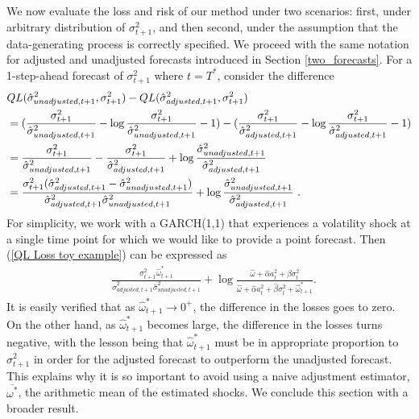 \documentclass{uiucthesis2021}
\theoremstyle{definition}
\begin{document}
We now evaluate the loss and risk of our method under two scenarios: first, under arbitrary distribution of $\sigma^{2}_{t+1}$, and then second, under the assumption that the data-generating process is correctly specified.  We proceed with the same notation for adjusted and unadjusted forecasts introduced in Section \ref{two_forecasts}.  For a 1-step-ahead forecast of $\sigma^{2}_{t+1}$ where $t=T^{*}$, consider the difference 
\begin{align}
  & QL(\hat\sigma_{unadjusted,t+1}^{2},\sigma^{2}_{t+1})-QL(\hat\sigma^{2}_{adjusted,t+1},\sigma^{2}_{t+1})\notag \\
   & =(\frac{\sigma_{t+1}^{2}}{\hat\sigma^{2}_{unadjusted,t+1}} - \log{\frac{\sigma_{t+1}^{2}}{\hat\sigma^{2}_{unadjusted,t+1}} } - 1) - (\frac{\sigma_{t+1}^{2}}{\hat\sigma^{2}_{adjusted,t+1}} - \log{\frac{\sigma_{t+1}^{2}}{\hat\sigma^{2}_{adjusted,t+1}}} - 1)\notag\\
   & = \frac{\sigma_{t+1}^{2}}{\hat\sigma^{2}_{unadjusted,t+1}} - \frac{\sigma_{t+1}^{2}}{\hat\sigma^{2}_{adjusted,t+1}}+ \log{\frac{\hat\sigma^{2}_{unadjusted,t+1}}{\hat\sigma^{2}_{adjusted,t+1}}}\notag\\
   & = \frac{\sigma_{t+1}^{2}(\hat\sigma^{2}_{adjusted,t+1}-\hat\sigma^{2}_{unadjusted,t+1})}{\hat\sigma^{2}_{adjusted,t+1}\hat\sigma^{2}_{unadjusted,t+1}} + \log{\frac{\hat\sigma^{2}_{unadjusted,t+1}}{\hat\sigma^{2}_{adjusted,t+1}}}\label{QL Loss toy example} \text{ .}
\end{align}
For simplicity, we work with a GARCH(1,1) that experiences a volatility shock at a single time point for which we would like to provide a point forecast.  Then (\ref{QL Loss toy example}) can be expressed as
\begin{align*}
   &\frac{\sigma^{2}_{t+1}\hat\omega^{*}_{t+1} }{\hat\sigma^{2}_{adjusted,t+1}\hat\sigma^{2}_{unadjusted,t+1}} + \log{\frac{\hat\omega + \hat\alpha a_{t}^{2} + \hat\beta\sigma_{t}^{2}}{\hat\omega + \hat\alpha a_{t}^{2} + \hat\beta\sigma_{t}^{2} + \hat\omega^{*}_{t+1}}}.
\end{align*}\label{QL Loss Consistency - GARCH(1,1)}
It is easily verified that as $\hat\omega^{*}_{t+1} \rightarrow 0^{+}$, the difference in the losses goes to zero.  On the other hand, as $\hat\omega^{*}_{t+1}$ becomes large, the difference in the losses turns negative, with the lesson being that $\hat\omega^{*}_{t+1}$ must be in appropriate proportion to $\sigma^{2}_{t+1}$ in order for the adjusted forecast to outperform the unadjusted forecast.  This explains why it is so important to avoid using a naive adjustment estimator, $\overline{\omega^{*}}$, the arithmetic mean of the estimated shocks.  We conclude this section with a broader result. 
\end{document}
